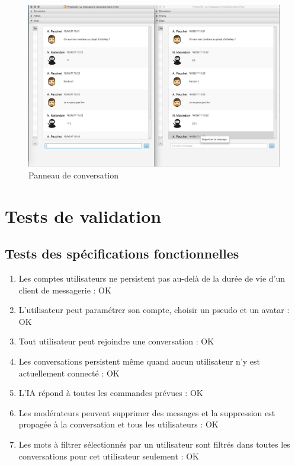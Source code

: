 \documentclass[11pt,dvipsnames,svgnames]{report}
\begin{document}
\begin{figure}[H]
\caption{Panneau de conversation}
\label{illuConv}
\centerline{\includegraphics[width=1.2\textwidth]{images/illuConv.png}}
\end{figure}

\section{Tests de validation}
\subsection{Tests des spécifications fonctionnelles}
\begin{enumerate}
\item Les comptes utilisateurs ne persistent pas au-delà de la durée de vie d'un client de messagerie : OK
\item L'utilisateur peut paramétrer son compte, choisir un pseudo et un avatar : OK
\item Tout utilisateur peut rejoindre une conversation : OK
\item Les conversations persistent même quand aucun utilisateur n'y est actuellement connecté : OK
\item L'IA répond à toutes les commandes prévues : OK
\item Les modérateurs peuvent supprimer des messages et la suppression est propagée à la conversation et tous les utilisateurs : OK
\item Les mots à filtrer sélectionnés par un utilisateur sont filtrés dans toutes les conversations pour cet utilisateur seulement : OK
\end{enumerate}
\end{document}
